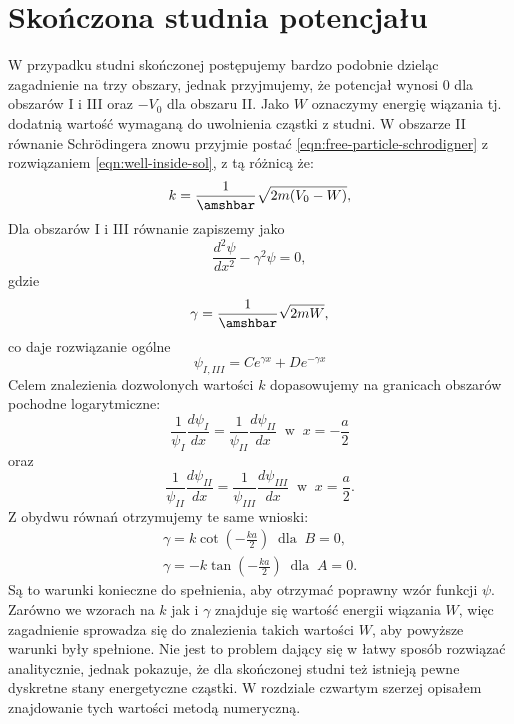 \documentclass{SGGW-thesis}
\begin{document}
	\section{Skończona studnia potencjału}
	W przypadku studni skończonej postępujemy bardzo podobnie dzieląc zagadnienie na trzy obszary, jednak przyjmujemy, że potencjał wynosi 0 dla obszarów I i III oraz $-V_0$ dla obszaru II. Jako $W$ oznaczymy energię wiązania tj. dodatnią wartość wymaganą do uwolnienia cząstki z studni. W obszarze II równanie Schrödingera znowu przyjmie postać \ref{eqn:free-particle-schrodigner} z rozwiązaniem \ref{eqn:well-inside-sol}, z tą różnicą że:
	\begin{equation}\label{eqn:k-fi-well}
	k=\frac{1}{\amshbar}\sqrt{2m(V_0-W)},
	\end{equation}
Dla obszarów I i III równanie zapiszemy jako
	\begin{equation}
	\frac{d^2\psi}{dx^2}-\gamma^2 \psi = 0,
	\end{equation}
gdzie
	\begin{equation}\label{eqn:gamma-fi-well}
	\gamma = \frac{1}{\amshbar}\sqrt{2mW},
	\end{equation}
co daje rozwiązanie ogólne
	\begin{equation}
	\psi_{I,III}= Ce^{\gamma x} + De^{-\gamma x}
	\end{equation}
Celem znalezienia dozwolonych wartości $k$ dopasowujemy na granicach obszarów pochodne logarytmiczne:
	\begin{equation}
	\frac{1}{\psi_I}\frac{d\psi_I}{dx} = \frac{1}{\psi_{II}}\frac{d\psi_{II}}{dx}
	\;\; \textrm{w}\;\; 
	x=-\frac{a}{2}
	\end{equation}
oraz
	\begin{equation}
	\frac{1}{\psi_{II}}\frac{d\psi_{II}}{dx} = \frac{1}{\psi_{III}}\frac{d\psi_{III}}{dx}
	\;\; \textrm{w} \;\;
	x=\frac{a}{2}.
	\end{equation}
Z obydwu równań otrzymujemy te same wnioski:
	\begin{equation}\label{eqn:fi-well-k-gamma}
	\begin{split}
	\gamma = k \cot\left(-\frac{ka}{2}\right)\;\; \textrm{dla} \;\; B = 0,\\
	\gamma = -k \tan\left(-\frac{ka}{2}\right)\;\; \textrm{dla} \;\; A = 0.
	\end{split}
	\end{equation}
Są to warunki konieczne do spełnienia, aby otrzymać poprawny wzór funkcji $\psi$.
Zarówno we wzorach na $k$ jak i $\gamma$ znajduje się wartość energii wiązania $W$, więc zagadnienie sprowadza się do znalezienia takich wartości $W$, aby powyższe warunki były spełnione. Nie jest to problem dający się w łatwy sposób rozwiązać analitycznie, jednak pokazuje, że dla skończonej studni też istnieją pewne dyskretne stany energetyczne cząstki. W rozdziale czwartym szerzej opisałem znajdowanie tych wartości metodą numeryczną.
\end{document}
